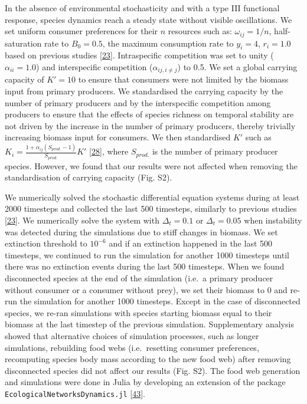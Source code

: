 \documentclass[
]{article}
\begin{document}
In the absence of environmental stochasticity and with
a type III functional response, species dynamics reach a steady state without
visible oscillations. We set uniform consumer preferences for their \(n\)
resources such as: \(\omega_{ij} = 1 / n\), half-saturation rate to \(B_0=0.5\),
the maximum consumption rate to \(y_i = 4\), \(r_i=1.0\) based on previous studies
{[}\protect\hyperlink{ref-brose_allometric_2006}{23}{]}.
Intraspecific competition was set to unity (\(\alpha_{ii} = 1.0\)) and
interspecific competition (\(\alpha_{ij, i \neq j}\)) to 0.5. We set a global
carrying capacity of \(K' = 10\) to ensure that consumers were not limited by the
biomass input from primary producers. We standardised the carrying capacity by
the number of primary producers and by the interspecific competition among
producers to ensure that the effects of species richness on temporal stability
are not driven by the increase in the number of primary producers, thereby
trivially increasing biomass input for consumers. We then standardised \(K'\) such
as \(K_i = \frac{1 + \alpha_{ij} (S_{prod.} - 1)}{S_{prod.}}K'\)
{[}\protect\hyperlink{ref-ives_stability_2000}{28}{]}, where \(S_{prod.}\) is the number of primary producer
species. However, we found that our results were not affected when removing the
standardisation of carrying capacity (Fig. S2).

We numerically solved the stochastic differential equation systems during at
least 2000 timesteps and collected the last 500 timesteps, similarly to previous
studies {[}\protect\hyperlink{ref-brose_allometric_2006}{23}{]}. We numerically solve the system with \(\Delta_t = 0.1\) or \(\Delta_t = 0.05\) when instability was detected during the simulations
due to stiff changes in biomass. We set extinction threshold to
\(10^{-6}\) and if an extinction happened in the last 500 timesteps, we continued
to run the simulation for another 1000 timesteps until there was no extinction
events during the last 500 timesteps. When we found disconnected species at the
end of the simulation (i.e.~a primary producer without consumer or a consumer
without prey), we set their biomass to 0 and re-run the simulation for another
1000 timesteps. Except in the case of disconnected species, we re-ran
simulations with species starting biomass equal to their biomass at the last
timestep of the previous simulation. Supplementary analysis showed that
alternative choices of simulation processes, such as longer simulations,
rebuilding food webs (i.e.~resetting consumer preferences, recomputing species
body mass according to the new food web) after removing disconnected species did
not affect our results (Fig. S2). The food web generation and simulations were
done in Julia by developing an extension of the package
\texttt{EcologicalNetworksDynamics.jl} {[}\protect\hyperlink{ref-lajaaiti_ecologicalnetworksdynamicsjl_2025}{43}{]}.
\end{document}
